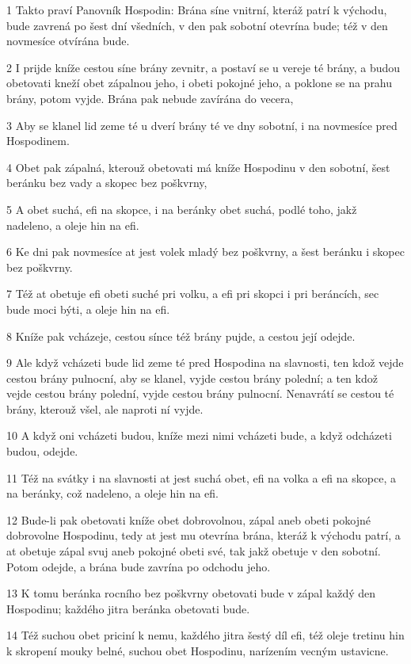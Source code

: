 \par 1 Takto praví Panovník Hospodin: Brána síne vnitrní, kteráž patrí k východu, bude zavrená po šest dní všedních, v den pak sobotní otevrína bude; též v den novmesíce otvírána bude.
\par 2 I prijde kníže cestou síne brány zevnitr, a postaví se u vereje té brány, a budou obetovati kneží obet zápalnou jeho, i obeti pokojné jeho, a poklone se na prahu brány, potom vyjde. Brána pak nebude zavírána do vecera,
\par 3 Aby se klanel lid zeme té u dverí brány té ve dny sobotní, i na novmesíce pred Hospodinem.
\par 4 Obet pak zápalná, kterouž obetovati má kníže Hospodinu v den sobotní, šest beránku bez vady a skopec bez poškvrny,
\par 5 A obet suchá, efi na skopce, i na beránky obet suchá, podlé toho, jakž nadeleno, a oleje hin na efi.
\par 6 Ke dni pak novmesíce at jest volek mladý bez poškvrny, a šest beránku i skopec bez poškvrny.
\par 7 Též at obetuje efi obeti suché pri volku, a efi pri skopci i pri beráncích, sec bude moci býti, a oleje hin na efi.
\par 8 Kníže pak vcházeje, cestou sínce též brány pujde, a cestou její odejde.
\par 9 Ale když vcházeti bude lid zeme té pred Hospodina na slavnosti, ten kdož vejde cestou brány pulnocní, aby se klanel, vyjde cestou brány polední; a ten kdož vejde cestou brány polední, vyjde cestou brány pulnocní. Nenavrátí se cestou té brány, kterouž všel, ale naproti ní vyjde.
\par 10 A když oni vcházeti budou, kníže mezi nimi vcházeti bude, a když odcházeti budou, odejde.
\par 11 Též na svátky i na slavnosti at jest suchá obet, efi na volka a efi na skopce, a na beránky, což nadeleno, a oleje hin na efi.
\par 12 Bude-li pak obetovati kníže obet dobrovolnou, zápal aneb obeti pokojné dobrovolne Hospodinu, tedy at jest mu otevrína brána, kteráž k východu patrí, a at obetuje zápal svuj aneb pokojné obeti své, tak jakž obetuje v den sobotní. Potom odejde, a brána bude zavrína po odchodu jeho.
\par 13 K tomu beránka rocního bez poškvrny obetovati bude v zápal každý den Hospodinu; každého jitra beránka obetovati bude.
\par 14 Též suchou obet priciní k nemu, každého jitra šestý díl efi, též oleje tretinu hin k skropení mouky belné, suchou obet Hospodinu, narízením vecným ustavicne.

